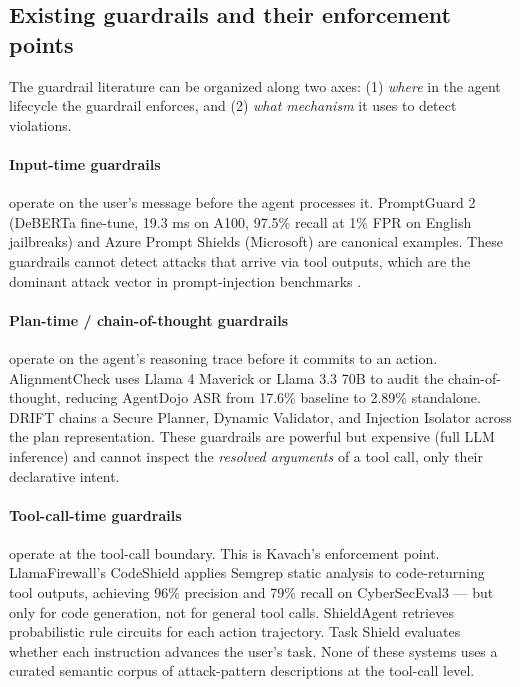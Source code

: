 \subsection{Existing guardrails and their enforcement points}

The guardrail literature can be organized along two axes: (1) \emph{where} in
the agent lifecycle the guardrail enforces, and (2) \emph{what mechanism}
it uses to detect violations.

\paragraph{Input-time guardrails} operate on the user's message before the
agent processes it. PromptGuard 2 \cite{saxe2025llamafirewall} (DeBERTa fine-tune,
19.3 ms on A100, 97.5\% recall at 1\% FPR on English jailbreaks) and Azure Prompt
Shields (Microsoft) are canonical examples. These guardrails cannot detect attacks
that arrive via tool outputs, which are the dominant attack vector in
prompt-injection benchmarks \cite{zhan2024injecagent}.

\paragraph{Plan-time / chain-of-thought guardrails} operate on the agent's
reasoning trace before it commits to an action. AlignmentCheck \cite{saxe2025llamafirewall}
uses Llama 4 Maverick or Llama 3.3 70B to audit the chain-of-thought, reducing
AgentDojo ASR from 17.6\% baseline to 2.89\% standalone. DRIFT \cite{drift2026}
chains a Secure Planner, Dynamic Validator, and Injection Isolator across the
plan representation. These guardrails are powerful but expensive (full LLM
inference) and cannot inspect the \emph{resolved arguments} of a tool call,
only their declarative intent.

\paragraph{Tool-call-time guardrails} operate at the tool-call boundary. This is
Kavach's enforcement point. LlamaFirewall's CodeShield
\cite{saxe2025llamafirewall} applies Semgrep static analysis to code-returning
tool outputs, achieving 96\% precision and 79\% recall on CyberSecEval3 — but
only for code generation, not for general tool calls. ShieldAgent
\cite{chen2025shieldagent} retrieves probabilistic rule circuits for each action
trajectory. Task Shield \cite{jia2025taskshield} evaluates whether each
instruction advances the user's task. None of these systems uses a curated
semantic corpus of attack-pattern descriptions at the tool-call level.

